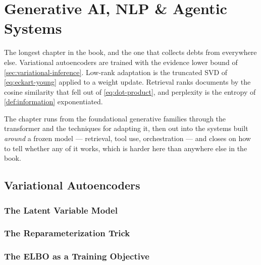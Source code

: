 %
\chapter{Generative AI, NLP \& Agentic Systems}
\label{ch:gen-ai}

The longest chapter in the book, and the one that collects debts from everywhere
else. Variational autoencoders are trained with the evidence lower bound of
\cref{sec:variational-inference}. Low-rank adaptation is the truncated SVD of
\cref{eq:eckart-young} applied to a weight update. Retrieval ranks documents by
the cosine similarity that fell out of \cref{eq:dot-product}, and perplexity is
the entropy of \cref{def:information} exponentiated.

The chapter runs from the foundational generative families through the
transformer and the techniques for adapting it, then out into the systems built
\emph{around} a frozen model --- retrieval, tool use, orchestration --- and
closes on how to tell whether any of it works, which is harder here than
anywhere else in the book.

\section{Variational Autoencoders}
\label{sec:vae}

\subsection{The Latent Variable Model}

\subsection{The Reparameterization Trick}


\subsection{The ELBO as a Training Objective}

